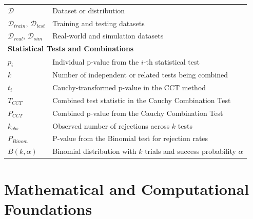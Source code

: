 \begin{appendices}
\begin{longtable}{p{}p{}}
    \midrule
    $\mathcal{D}$                               & Dataset or distribution                                                              \\
    $\mathcal{D}_{train}$, $\mathcal{D}_{test}$ & Training and testing datasets                                                        \\
    $\mathcal{D}_{real}$, $\mathcal{D}_{sim}$   & Real-world and simulation datasets                                                   \\
    \midrule
    \multicolumn{2}{l}{\textbf{Statistical Tests and Combinations}}                                                                    \\
    \midrule
    $p_i$                                       & Individual p-value from the $i$-th statistical test                                  \\
    $k$                                         & Number of independent or related tests being combined                                \\
    $t_i$                                       & Cauchy-transformed p-value in the CCT method                                         \\
    $T_{CCT}$                                   & Combined test statistic in the Cauchy Combination Test                               \\
    $P_{CCT}$                                   & Combined p-value from the Cauchy Combination Test                                    \\
    $k_{obs}$                                   & Observed number of rejections across $k$ tests                                       \\
    $P_{Binom}$                                 & P-value from the Binomial test for rejection rates                                   \\
    $B(k, \alpha)$                              & Binomial distribution with $k$ trials and success probability $\alpha$               \\
  \end{longtable}
  \endgroup


  \section{Mathematical and Computational Foundations}
  \label{app:math_foundations} %


\end{appendices}
